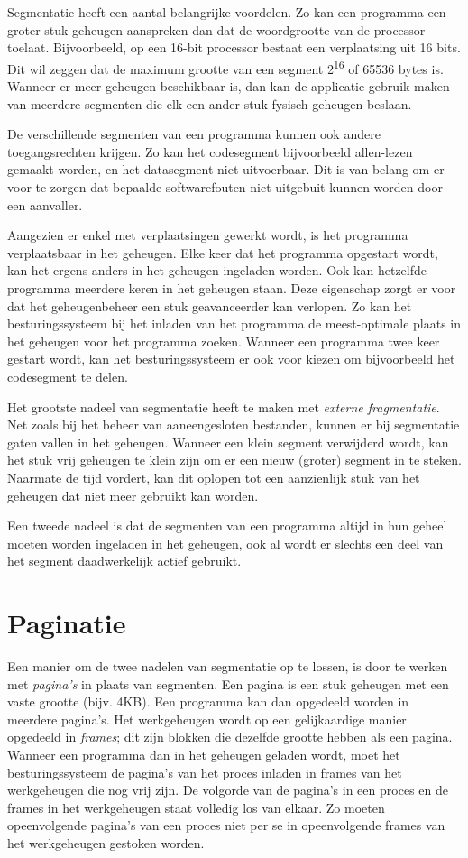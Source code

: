 Segmentatie heeft een aantal belangrijke voordelen. Zo kan een programma een groter stuk geheugen aanspreken dan dat de woordgrootte van de processor toelaat. Bijvoorbeeld, op een 16-bit processor bestaat een verplaatsing uit 16 bits. Dit wil zeggen dat de maximum grootte van een segment 2\textsuperscript{16} of 65536 bytes is. Wanneer er meer geheugen beschikbaar is, dan kan de applicatie gebruik maken van meerdere segmenten die elk een ander stuk fysisch geheugen beslaan.

De verschillende segmenten van een programma kunnen ook andere toegangsrechten krijgen. Zo kan het codesegment bijvoorbeeld allen-lezen gemaakt worden, en het datasegment niet-uitvoerbaar. Dit is van belang om er voor te zorgen dat bepaalde softwarefouten niet uitgebuit kunnen worden door een aanvaller.

Aangezien er enkel met verplaatsingen gewerkt wordt, is het programma verplaatsbaar in het geheugen. Elke keer dat het programma opgestart wordt, kan het ergens anders in het geheugen ingeladen worden. Ook kan hetzelfde programma meerdere keren in het geheugen staan. Deze eigenschap zorgt er voor dat het geheugenbeheer een stuk geavanceerder kan verlopen. Zo kan het besturingssysteem bij het inladen van het programma de meest-optimale plaats in het geheugen voor het programma zoeken. Wanneer een programma twee keer gestart wordt, kan het besturingssysteem er ook voor kiezen om bijvoorbeeld het codesegment te delen.

Het grootste nadeel van segmentatie heeft te maken met \emph{externe fragmentatie}. Net zoals bij het beheer van aaneengesloten bestanden, kunnen er bij segmentatie gaten vallen in het geheugen. Wanneer een klein segment verwijderd wordt, kan het stuk vrij geheugen te klein zijn om er een nieuw (groter) segment in te steken. Naarmate de tijd vordert, kan dit oplopen tot een aanzienlijk stuk van het geheugen dat niet meer gebruikt kan worden.

Een tweede nadeel is dat de segmenten van een programma altijd in hun geheel moeten worden ingeladen in het geheugen, ook al wordt er slechts een deel van het segment daadwerkelijk actief gebruikt.

\section{Paginatie}

Een manier om de twee nadelen van segmentatie op te lossen, is door te werken met \emph{pagina's} in plaats van segmenten. Een pagina is een stuk geheugen met een vaste grootte (bijv. 4KB). Een programma kan dan opgedeeld worden in meerdere pagina's. Het werkgeheugen wordt op een gelijkaardige manier opgedeeld in \emph{frames}; dit zijn blokken die dezelfde grootte hebben als een pagina. Wanneer een programma dan in het geheugen geladen wordt, moet het besturingssysteem de pagina's van het proces inladen in frames van het werkgeheugen die nog vrij zijn. De volgorde van de pagina's in een proces en de frames in het werkgeheugen staat volledig los van elkaar. Zo moeten opeenvolgende pagina's van een proces niet per se in opeenvolgende frames van het werkgeheugen gestoken worden.

